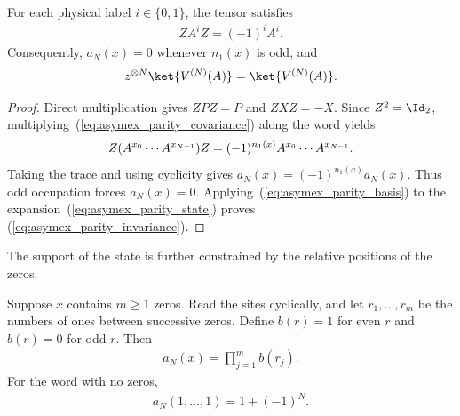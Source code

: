 \begin{lemma}
    \label{thm:asymex_parity_occupation}
    \leanok
    For each physical label $i\in\{0,1\}$, the tensor satisfies
    \begin{align}
        ZA^iZ=(-1)^iA^i.
        \label{eq:asymex_parity_covariance}
    \end{align}
    Consequently, $a_N(x)=0$ whenever $n_1(x)$ is odd, and
    \begin{align}
        z^{\otimes N}\ket{V^{(N)}(A)}=\ket{V^{(N)}(A)}.
        \label{eq:asymex_parity_invariance}
    \end{align}
\end{lemma}

\begin{proof}
    \leanok
    Direct multiplication gives $ZPZ=P$ and $ZXZ=-X$.
    Since $Z^2=\Id_2$, multiplying~(\ref{eq:asymex_parity_covariance})
    along the word yields
    \begin{align}
        Z(A^{x_0}\cdots A^{x_{N-1}})Z
        =(-1)^{n_1(x)}A^{x_0}\cdots A^{x_{N-1}}.
        \notag
    \end{align}
    Taking the trace and using cyclicity gives
    $a_N(x)=(-1)^{n_1(x)}a_N(x)$. Thus odd occupation forces
    $a_N(x)=0$. Applying~(\ref{eq:asymex_parity_basis}) to the
    expansion~(\ref{eq:asymex_parity_state}) proves
    (\ref{eq:asymex_parity_invariance}).
\end{proof}

The support of the state is further constrained by the relative positions of the
zeros.

\begin{lemma}
    \label{thm:asymex_parity_runs}
    \leanok
    Suppose $x$ contains $m\geq1$ zeros. Read the sites cyclically, and
    let $r_1,\ldots,r_m$ be the numbers of ones between successive
    zeros. Define $b(r)=1$ for even $r$ and $b(r)=0$ for odd $r$.
    Then
    \begin{align}
        a_N(x)=\prod_{j=1}^{m}b(r_j).
        \label{eq:asymex_parity_runs}
    \end{align}
    For the word with no zeros,
    \begin{align}
        a_N(1,\ldots,1)=1+(-1)^N.
        \label{eq:asymex_parity_all_one}
    \end{align}
\end{lemma}

